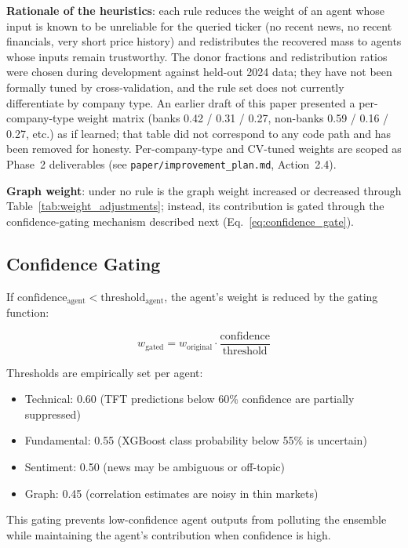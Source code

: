 \documentclass[conference]{IEEEtran}
\begin{document}
\textbf{Rationale of the heuristics}: each rule reduces the weight of an agent whose input is known to be unreliable for the queried ticker (no recent news, no recent financials, very short price history) and redistributes the recovered mass to agents whose inputs remain trustworthy. The donor fractions and redistribution ratios were chosen during development against held-out 2024 data; they have not been formally tuned by cross-validation, and the rule set does not currently differentiate by company type. An earlier draft of this paper presented a per-company-type weight matrix (banks 0.42 / 0.31 / 0.27, non-banks 0.59 / 0.16 / 0.27, etc.) as if learned; that table did not correspond to any code path and has been removed for honesty. Per-company-type and CV-tuned weights are scoped as Phase~2 deliverables (see \texttt{paper/improvement\_plan.md}, Action~2.4).

\textbf{Graph weight}: under no rule is the graph weight increased or decreased through Table~\ref{tab:weight_adjustments}; instead, its contribution is gated through the confidence-gating mechanism described next (Eq.~\ref{eq:confidence_gate}).

\subsection{Confidence Gating}

If $\text{confidence}_{\text{agent}} < \text{threshold}_{\text{agent}}$, the agent's weight is reduced by the gating function:

\begin{equation}
w_{\text{gated}} = w_{\text{original}} \cdot \frac{\text{confidence}}{\text{threshold}}
\label{eq:confidence_gate}
\end{equation}

Thresholds are empirically set per agent:
\begin{itemize}
\item Technical: 0.60 (TFT predictions below 60\% confidence are partially suppressed)
\item Fundamental: 0.55 (XGBoost class probability below 55\% is uncertain)
\item Sentiment: 0.50 (news may be ambiguous or off-topic)
\item Graph: 0.45 (correlation estimates are noisy in thin markets)
\end{itemize}

This gating prevents low-confidence agent outputs from polluting the ensemble while maintaining the agent's contribution when confidence is high.
\end{document}

